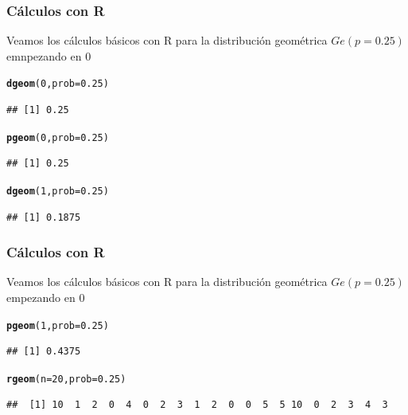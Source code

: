 \documentclass[handout]{beamer}\usepackage[]{graphicx}\usepackage[]{color}
\makeatletter
\newcommand{\hlnum}[1]{\textcolor[rgb]{0.686,0.059,0.569}{#1}}%
\newcommand{\hlstd}[1]{\textcolor[rgb]{0.345,0.345,0.345}{#1}}%
\newcommand{\hlkwc}[1]{\textcolor[rgb]{0.333,0.667,0.333}{#1}}%
\newcommand{\hlkwd}[1]{\textcolor[rgb]{0.737,0.353,0.396}{\textbf{#1}}}%
\newenvironment{kframe}{%
 \def\at@end@of@kframe{}%
 \ifinner\ifhmode%
  \def\at@end@of@kframe{\end{minipage}}%
  \begin{minipage}{\columnwidth}%
 \fi\fi%
 \def\FrameCommand##1{\hskip\@totalleftmargin \hskip-\fboxsep
 \colorbox{shadecolor}{##1}\hskip-\fboxsep
     \hskip-\linewidth \hskip-\@totalleftmargin \hskip\columnwidth}%
 \MakeFramed {\advance\hsize-\width
   \@totalleftmargin\z@ \linewidth\hsize
   \@setminipage}}%
 {\par\unskip\endMakeFramed%
 \at@end@of@kframe}
\newenvironment{knitrout}{}{} %
\theoremstyle{plain}
\theoremstyle{definition}
\makeatother
\begin{document}
\begin{frame}[fragile]
\frametitle{Cálculos con R}
Veamos los cálculos básicos con  R para la distribución geométrica  $Ge(p=0.25)$ emnpezando en $0$

\begin{knitrout}
\color{fgcolor}\begin{kframe}
\begin{alltt}
\hlkwd{dgeom}\hlstd{(}\hlnum{0}\hlstd{,}\hlkwc{prob}\hlstd{=}\hlnum{0.25}\hlstd{)}
\end{alltt}
\begin{verbatim}
## [1] 0.25
\end{verbatim}
\begin{alltt}
\hlkwd{pgeom}\hlstd{(}\hlnum{0}\hlstd{,}\hlkwc{prob}\hlstd{=}\hlnum{0.25}\hlstd{)}
\end{alltt}
\begin{verbatim}
## [1] 0.25
\end{verbatim}
\begin{alltt}
\hlkwd{dgeom}\hlstd{(}\hlnum{1}\hlstd{,}\hlkwc{prob}\hlstd{=}\hlnum{0.25}\hlstd{)}
\end{alltt}
\begin{verbatim}
## [1] 0.1875
\end{verbatim}
\end{kframe}
\end{knitrout}

\end{frame}

\begin{frame}[fragile]
\frametitle{Cálculos con R}
Veamos los cálculos básicos con  R para la distribución geométrica  $Ge(p=0.25)$ empezando en $0$

\begin{knitrout}
\color{fgcolor}\begin{kframe}
\begin{alltt}
\hlkwd{pgeom}\hlstd{(}\hlnum{1}\hlstd{,}\hlkwc{prob}\hlstd{=}\hlnum{0.25}\hlstd{)}
\end{alltt}
\begin{verbatim}
## [1] 0.4375
\end{verbatim}
\begin{alltt}
\hlkwd{rgeom}\hlstd{(}\hlkwc{n}\hlstd{=}\hlnum{20}\hlstd{,}\hlkwc{prob}\hlstd{=}\hlnum{0.25}\hlstd{)}
\end{alltt}
\begin{verbatim}
##  [1] 10  1  2  0  4  0  2  3  1  2  0  0  5  5 10  0  2  3  4  3
\end{verbatim}
\end{kframe}
\end{knitrout}

\end{frame}
\end{document}
